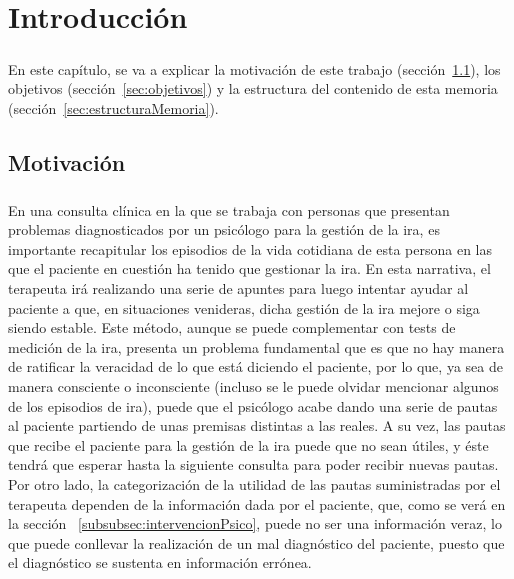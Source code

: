 %
%

\chapter{Introducción}

\paragraph{}
En este capítulo, se va a explicar la motivación de este trabajo (sección~\ref{sec:motivacion}), los objetivos (sección~\ref{sec:objetivos}) y la estructura del contenido de esta memoria (sección~\ref{sec:estructuraMemoria}).

\section{Motivación}
\label{sec:motivacion}
\paragraph{}
En una consulta clínica en la que se trabaja con personas que presentan problemas diagnosticados por un psicólogo para la gestión de la ira, es importante recapitular los episodios de la vida cotidiana de esta persona en las que el paciente en cuestión ha tenido que gestionar la ira. En esta narrativa, el terapeuta irá realizando una serie de apuntes para luego intentar ayudar al paciente a que, en situaciones venideras, dicha gestión de la ira mejore o siga siendo estable. Este método, aunque se puede complementar con tests de medición de la ira, presenta un problema fundamental que es que no hay manera de ratificar la veracidad de lo que está diciendo el paciente, por lo que, ya sea de manera consciente o inconsciente (incluso se le puede olvidar mencionar algunos de los episodios de ira), puede que el psicólogo acabe dando una serie de pautas al paciente partiendo de unas premisas distintas a las reales. A su vez, las pautas que recibe el paciente para la gestión de la ira puede que no sean útiles, y éste tendrá que esperar hasta la siguiente consulta para poder recibir nuevas pautas. Por otro lado, la categorización de la utilidad de las pautas suministradas por el terapeuta dependen de la información dada por el paciente, que, como se verá en la sección ~\ref{subsubsec:intervencionPsico}, puede no ser una información veraz, lo que puede conllevar la realización de un mal diagnóstico del paciente, puesto que el diagnóstico se sustenta en información errónea.

